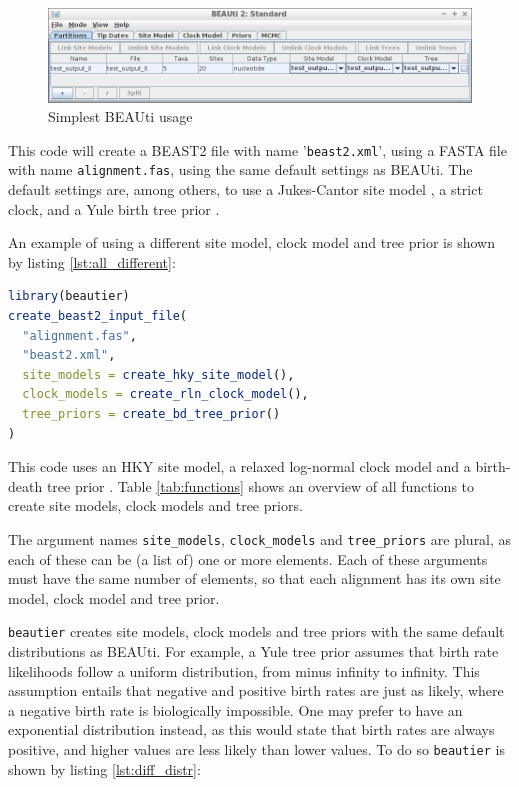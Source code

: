 \documentclass{article}
\begin{document}
\begin{figure}
  \centering
  \includegraphics[width=\textwidth]{all_default.png}
  \caption{Simplest BEAUti usage}
  \label{fig:simplest_beauti_usage}
\end{figure}

This code will create a BEAST2 file with name '\verb;beast2.xml;',
using a FASTA file with name \verb;alignment.fas;, using the same default settings as BEAUti.
The default settings are, among others, to use a Jukes-Cantor site model \cite{cantor1969mammalian}, 
a strict clock, and a Yule birth tree prior \cite{yule}. 

An example of using a different site model, clock model and tree prior is shown by listing \ref{lst:all_different}:

\begin{lstlisting}[language=R, caption=Example with different site model and clock model and tree prior, label=lst:all_different, floatplacement=H]
library(beautier)
create_beast2_input_file(
  "alignment.fas",
  "beast2.xml",
  site_models = create_hky_site_model(),
  clock_models = create_rln_clock_model(),
  tree_priors = create_bd_tree_prior()
)
\end{lstlisting}

This code uses an HKY site model, a relaxed log-normal clock model and a birth-death tree prior \cite{kendall1948generalized}.
Table \ref{tab:functions} shows an overview of all functions to create site models, clock models and tree priors.

The argument names \verb;site_models;, \verb;clock_models; and \verb;tree_priors; are plural, as each of these
can be (a list of) one or more elements. Each of these arguments must have the same number of elements, so that each alignment has its
own site model, clock model and tree prior. 

\verb;beautier; creates site models, clock models and tree priors with the same default distributions as BEAUti.
For example, a Yule tree prior assumes that birth rate likelihoods follow a uniform distribution, from minus infinity
to infinity. This assumption entails that negative and positive birth rates are just as likely, where a negative birth rate is biologically impossible. 
One may prefer to have an exponential distribution instead, as this would state that birth rates are always positive, and
higher values are less likely than lower values. To do so \verb;beautier; is shown by listing \ref{lst:diff_distr}:
\end{document}
